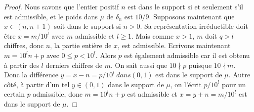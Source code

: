 \begin{proof}
	Nous savons que l'entier positif $n$ est dans le support si et seulement
	s'il est admissible, et le poids dans $\mu$ de $\delta_{n}$ est $10/9$.
	Supposons maintenant que $x\in (n, n+1)$ soit dans le support si $n > 0$.
	Sa représentation irréductible doit être $x=m/10^{l}$ avec $m$ admissible
	et $l \ge 1$. Mais comme $x>1$, $m$ doit $q > l$ chiffres, donc $n$, la
	partie entière de $x$, est admissible. Ecrivons maintenant $m = 10^{l}n +
	p$ avec $0 \le p < 10^{l}$. Alors $p$ est également admissible car il est
	obtenu à partir des $l$ derniers chiffres de $m$. On sait aussi que
	$10\nmid p$ puisque $10\nmid m$. Donc la différence $y=x-n = p/10^{l}\ dans
	(0, 1)$ est dans le support de $\mu$. Autre côté, à partir d'un tel
	$y\in (0, 1)$ dans le support de $\mu$, on l'écrit $p/10^{l}$ pour un
	certain $p$ admissible, donc $m=10^{l}n+p$ est admissible et $x = y+n =
	m/10^{l}$ est dans le support de $\mu$.

\end{proof}
